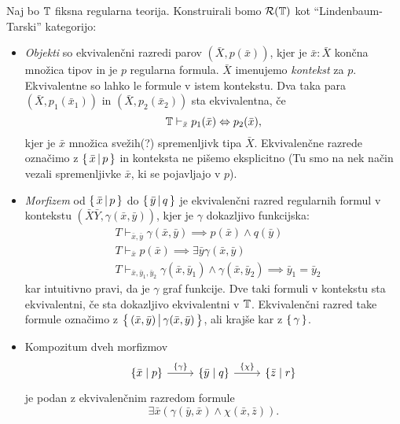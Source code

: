 \documentclass[../kategoricna_logika.tex]{subfiles}
\begin{document}
\begin{definicija}
  Naj bo $\mathbb{T}$ fiksna regularna teorija. Konstruirali bomo
  $\mathcal{R}(\mathbb{T})$ kot "`Lindenbaum-Tarski"' kategorijo:
  \begin{itemize}
  \item \emph{Objekti} so ekvivalenčni razredi parov
    $(\bar{X}, p(\bar{x}))$, kjer je $\bar{x} : \bar{X}$ končna
    množica tipov in je $p$ regularna formula.  $\bar{X}$ imenujemo
    \emph{kontekst} za $p$. Ekvivalentne so lahko le formule v istem
    kontekstu.  Dva taka para $(\bar{X}, p_1(\bar{x}_1))$ in
    $(\bar{X}, p_2(\bar{x}_2))$ sta ekvivalentna, če
      $$\mathbb{T} \vdash_{\bar{x}} p_1(\bar{x}) \Leftrightarrow p_2(\bar{x}),$$
      kjer je $\bar{x}$ množica svežih(?) spremenljivk tipa $\bar{X}$.
      Ekvivalenčne razrede označimo z $\left\lbrace\,\bar{x} \,\middle|\, p\,\right\rbrace$
      in konteksta ne pišemo eksplicitno (Tu smo na nek način vezali
      spremenljivke $\bar{x}$, ki se pojavljajo v $p$).
    \item \emph{Morfizem} od $\left\lbrace\,\bar{x} \,\middle|\, p\,\right\rbrace$ do
      $\left\lbrace\,\bar{y} \,\middle|\, q\,\right\rbrace$ je ekvivalenčni razred regularnih
      formul v kontekstu $(\bar{X}\bar{Y}, \gamma(\bar{x},\bar{y}))$,
      kjer je $\gamma$ dokazljivo funkcijska:
      \begin{align*}
        &T \vdash_{\bar{x},\bar{y}} \gamma(\bar{x},\bar{y})  \implies p(\bar{x}) \wedge q(\bar{y}) \\
        &T \vdash_{\bar{x}} p(\bar{x}) \implies \exists \bar{y} \gamma(\bar{x},\bar{y}) \\
        &T \vdash_{\bar{x},\bar{y}_1,\bar{y}_2} \gamma(\bar{x},\bar{y}_1) \wedge \gamma(\bar{x},\bar{y}_2) \implies \bar{y}_1 = \bar{y}_2
      \end{align*}
      kar intuitivno pravi, da je $\gamma$ graf funkcije.  Dve taki
      formuli v kontekstu sta ekvivalentni, če sta dokazljivo
      ekvivalentni v $\mathbb{T}$.  Ekvivalenčni razred take formule označimo
      z
      $\left\lbrace\,(\bar{x},\bar{y}) \,\middle|\, \gamma(\bar{x},\bar{y})\,\right\rbrace$,
      ali krajše kar z $\left\lbrace\,\gamma\,\right\rbrace$.
    \item Kompozitum dveh morfizmov
      \begin{equation*}
        \begin{tikzcd}[column sep=normal]
          \lbrace \bar{x} \mid p\rbrace \ar[r, "\lbrace \gamma
          \rbrace"] & \lbrace \bar{y} \mid q \rbrace \ar[r, "\lbrace
          \chi \rbrace"] & \lbrace \bar{z} \mid r \rbrace
        \end{tikzcd}
      \end{equation*}           
      je podan z ekvivalenčnim razredom formule
      $$\exists \bar{x}(\gamma(\bar{y},\bar{x}) \wedge \chi(\bar{x},\bar{z})).$$
    \end{itemize}
  \end{definicija}
\end{document}
